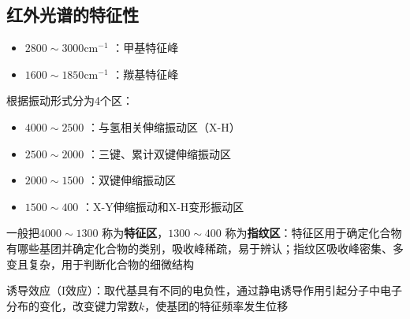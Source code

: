 \subsection{红外光谱的特征性}%
\label{sub:红外光谱的特征性}
\begin{eg}
    \begin{itemize}
        \item $2800\sim 3000\text{cm}^{-1}$ ：甲基特征峰
        \item $1600\sim 1850\text{cm}^{-1}$ ：羰基特征峰
    \end{itemize}
\end{eg}
根据振动形式分为4个区：
\begin{itemize}
    \item $4000\sim 2500$ ：与氢相关伸缩振动区（X-H）
    \item $2500\sim 2000$ ：三键、累计双键伸缩振动区
    \item $2000\sim 1500$ ：双键伸缩振动区
    \item $1500\sim 400$ ：X-Y伸缩振动和X-H变形振动区
\end{itemize}
一般把$4000\sim 1300$ 称为\textbf{特征区}，$1300\sim 400$ 称为\textbf{指纹区}：特征区用于确定化合物有哪些基团并确定化合物的类别，吸收峰稀疏，易于辨认；指纹区吸收峰密集、多变且复杂，用于判断化合物的细微结构
\begin{notation}
    诱导效应（I效应）：取代基具有不同的电负性，通过静电诱导作用引起分子中电子分布的变化，改变键力常数$k$，使基团的特征频率发生位移
\end{notation}
